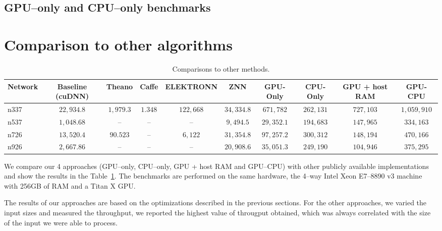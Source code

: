 \documentclass[conference]{./IEEEtran/IEEEtran}
\begin{document}
\subsection{GPU--only and CPU--only benchmarks}



\section{Comparison to other algorithms}


  \begin{table}[h!tbp]
    \centering
    \begin{tabular}{l|ccccccccc}
      \toprule
      Network  & Baseline (cuDNN)  & Theano      & Caffe    & ELEKTRONN   & ZNN         & GPU-Only    & CPU-Only    & GPU + host RAM & GPU-CPU   \\
      \midrule
      n337     & $22,934.8$        & $1,979.3$   & $1.348$  & $122,668$   & $34,334.8$  & $671,782$   & $262,131$   & $727,103$      & $1,059,910$ \\
      n537     & $1,048.68$        & --          & --       & --          & $9,494.5$   & $29,352.1$  & $194,683$   & $147,965$      & $334,163$ \\
      n726     & $13,520.4$        & $90.523$    & --       & $6,122$     & $31,354.8$  & $97,257.2$  & $300,312$   & $148,194$      & $470,166$ \\
      n926     & $2,667.86$        & --          & --       & --          & $20,908.6$  & $35,051.3$  & $249,190$   & $104,946$      & $375,295$ \\
      \bottomrule
    \end{tabular}
    \caption{Comparisons to other methods.}
    \label{table:comparisons_to_others}
  \end{table}

  We compare our 4 approaches (GPU--only, CPU--only, GPU + host RAM
  and GPU--CPU) with other publicly available implementations and show
  the results in the Table~\ref{table:comparisons_to_others}.  The
  benchmarks are performed on the same hardware, the 4--way Intel Xeon
  E7–8890 v3 machine with 256GB of RAM and a Titan X GPU.

  The results of our approaches are based on the optimizations
  described in the previous sections.  For the other approaches, we
  varied the input sizes and measured the throughput, we reported the
  highest value of througput obtained, which was always correlated
  with the size of the input we were able to process.
\end{document}
